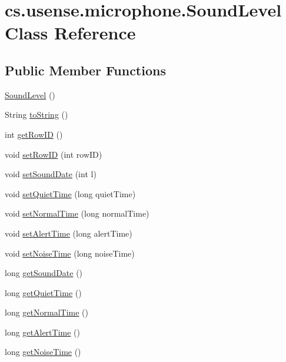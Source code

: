 \hypertarget{classcs_1_1usense_1_1microphone_1_1_sound_level}{}\section{cs.\+usense.\+microphone.\+Sound\+Level Class Reference}
\label{classcs_1_1usense_1_1microphone_1_1_sound_level}
\subsection*{Public Member Functions}
\begin{DoxyCompactItemize}
\item 
\hyperlink{classcs_1_1usense_1_1microphone_1_1_sound_level_ad67b6499cbcb3b3c321d07af3770620c}{Sound\+Level} ()
\item 
String \hyperlink{classcs_1_1usense_1_1microphone_1_1_sound_level_a0d4512665cd38abfc185490f5392e40f}{to\+String} ()
\item 
int \hyperlink{classcs_1_1usense_1_1microphone_1_1_sound_level_a74e1c0af29d5ef346034858dfbfa3227}{get\+Row\+I\+D} ()
\item 
void \hyperlink{classcs_1_1usense_1_1microphone_1_1_sound_level_a8880da55efbd43281a80611584f286ca}{set\+Row\+I\+D} (int row\+I\+D)
\item 
void \hyperlink{classcs_1_1usense_1_1microphone_1_1_sound_level_aeda724a333ac9a0dfccae36bf453faca}{set\+Sound\+Date} (int l)
\item 
void \hyperlink{classcs_1_1usense_1_1microphone_1_1_sound_level_af7bdb1c52fab489294fc405c615ad842}{set\+Quiet\+Time} (long quiet\+Time)
\item 
void \hyperlink{classcs_1_1usense_1_1microphone_1_1_sound_level_a4892a637b6da9a4a34975a99b7bf9f64}{set\+Normal\+Time} (long normal\+Time)
\item 
void \hyperlink{classcs_1_1usense_1_1microphone_1_1_sound_level_ab657542b11c32dc25c8111d535a00e82}{set\+Alert\+Time} (long alert\+Time)
\item 
void \hyperlink{classcs_1_1usense_1_1microphone_1_1_sound_level_ac8ed0257ece62de2892ebf9bf1be7d6a}{set\+Noise\+Time} (long noise\+Time)
\item 
long \hyperlink{classcs_1_1usense_1_1microphone_1_1_sound_level_ab6729a7d77df3965e7e06e06ae9f7217}{get\+Sound\+Date} ()
\item 
long \hyperlink{classcs_1_1usense_1_1microphone_1_1_sound_level_aefcdfc4d7d9fb3fa21f462f31591e20f}{get\+Quiet\+Time} ()
\item 
long \hyperlink{classcs_1_1usense_1_1microphone_1_1_sound_level_a947923fee544027a6586316a10a935b4}{get\+Normal\+Time} ()
\item 
long \hyperlink{classcs_1_1usense_1_1microphone_1_1_sound_level_aab4a3adbeac526d0956fbef7d93842b8}{get\+Alert\+Time} ()
\item 
long \hyperlink{classcs_1_1usense_1_1microphone_1_1_sound_level_a40b8d7e11d15d5bc7caaac941da42a39}{get\+Noise\+Time} ()
\end{DoxyCompactItemize}

